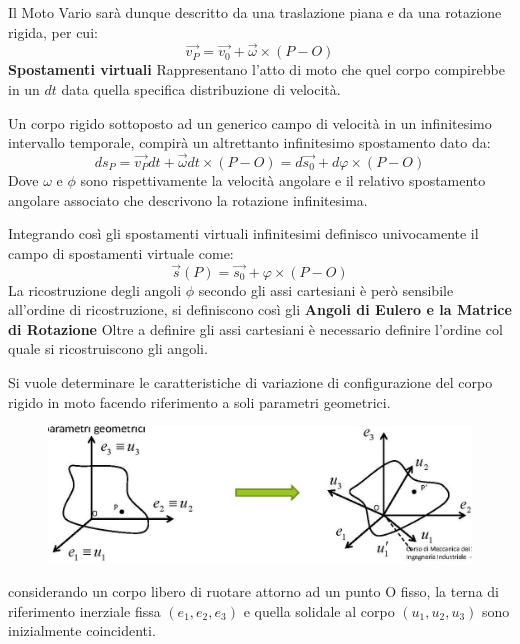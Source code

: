 \documentclass{article}
\begin{document}
\begin{adjustwidth}{2in}{}
Il Moto Vario sarà dunque descritto da una traslazione piana e da una rotazione rigida, per cui: 
\[ \vec{v_{P}} = \vec{v_{0}} + \vec{\omega} \times (P-O)\]
\textbf{Spostamenti virtuali} \mbox{} \newline
Rappresentano l'atto di moto che quel corpo compirebbe in un $dt$ data quella specifica distribuzione di velocità.

Un corpo rigido sottoposto ad un generico campo di velocità in un infinitesimo intervallo temporale, compirà un altrettanto infinitesimo spostamento dato da:
\[
ds_{P} = \vec{v_{P}}dt + \vec{\omega}dt \times (P-O) = d\vec{s_{0}} + d\varphi \times (P-O)
\]
Dove $\omega$ e $\phi$ sono rispettivamente la velocità angolare e il relativo spostamento angolare associato che descrivono la rotazione infinitesima. \newline

Integrando così gli spostamenti virtuali infinitesimi definisco univocamente il campo di spostamenti virtuale come: 
\[
\vec{s}(P) = \vec{s_{0}} + \varphi \times (P-O)
\]
La ricostruzione degli angoli $\phi$ secondo gli assi cartesiani è però sensibile all'ordine di ricostruzione, si definiscono così gli \newline
 \textbf{Angoli di Eulero e la Matrice di Rotazione} \mbox{} \newline
 Oltre a definire gli assi cartesiani è necessario definire l'ordine col quale si ricostruiscono gli angoli.
  
Si vuole determinare le caratteristiche di variazione di configurazione del corpo rigido in moto facendo riferimento a soli parametri geometrici. \newline
\begin{figure}[H]
	\centering
	\includegraphics[width=0.5\linewidth]{"immagini/1.PARTE1_Pagina_19"}
\end{figure}
considerando un corpo libero di ruotare attorno ad un punto O fisso, la terna di riferimento inerziale fissa $(e_{1},e_{2},e_{3})$ e quella solidale al corpo $(u_{1},u_{2},u_{3})$ sono inizialmente coincidenti.\newline


\end{adjustwidth}
\end{document}
